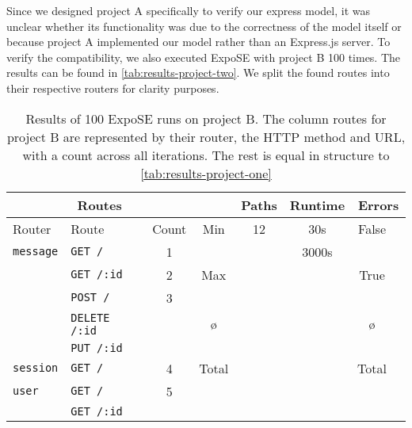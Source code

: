 Since we designed project A specifically to verify our express model, it was unclear whether its functionality was due to the correctness of the model itself or because project A implemented our model rather than an Express.js server. To verify the compatibility, we also executed ExpoSE with project B 100 times.
The results can be found in \autoref{tab:results-project-two}.
We split the found routes into their respective routers for clarity purposes. 



\begin{table}[ht]
\begin{tabularx}{\linewidth}{@{\extracolsep{\fill}}llcccccc}
	\toprule \multicolumn{3}{c}{Routes}                                          &                         & Paths & Runtime & \multicolumn{2}{c}{Errors} \\
	\midrule Router                                                              & Route                   & Count & Min     & 12                        & 30s   & False&  \\
    \cmidrule(lr){1-3} \cmidrule(lr){4-4} \cmidrule(lr){7-7} \lstinline+message+ & \lstinline+GET /+       & 1     &         &                           & 3000s &      &  \\
	\cmidrule(r){1-1} \cmidrule(lr){2-2}                                         & \lstinline+GET /:id+    & 2     &   Max   &                           &       & True &  \\
	\cmidrule(lr){2-2} \cmidrule(lr){4-4} \cmidrule(lr){7-7}                     & \lstinline+POST /+   & 3     &         &                           &       & &  \\
	\cmidrule(lr){2-2}                                                           & \lstinline+DELETE /:id+ &       &   \o{}   &                           &       & \o{}   &  \\
    \cmidrule(lr){2-2}\cmidrule(lr){4-4}\cmidrule(lr){7-7}                       & \lstinline+PUT /:id+    &       &         &                           &       &       &  \\
    \cmidrule(lr){2-2}
	\lstinline+session+                                                          & \lstinline+GET /+       & 4     & Total   &                           &       &Total &  \\
	\cmidrule(r){1-1}\cmidrule(lr){2-2}\cmidrule(lr){4-4}\cmidrule(lr){7-7}
                                                                \lstinline+user+ & \lstinline+GET /+       & 5     &         &                           &       &       &  \\
	\cmidrule(r){1-1}\cmidrule(lr){2-2}                                          & \lstinline+GET /:id+    &       &         &                           &       &       &  \\
	\bottomrule
\end{tabularx}
\caption[General results of project B]{Results of 100 ExpoSE runs on project B.
	The column routes for project B are represented by their router, the HTTP method and URL, with
	a count across all iterations. The rest is equal in structure to \autoref{tab:results-project-one} }
\label{tab:results-project-two}
\end{table}


